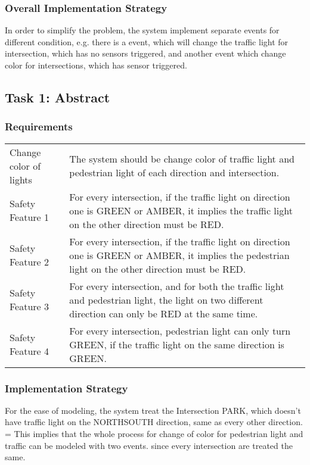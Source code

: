 \documentclass[a4paper]{article}
\begin{document}
\subsubsection{Overall Implementation Strategy}

\indent\indent In order to simplify the problem, the system implement separate events for different condition, e.g. there is a event, which will change the traffic light for intersection, which has no sensors triggered, and another event which change color for intersections, which has sensor triggered.

\subsection{Task 1: Abstract}
\subsubsection{Requirements}
\begin{center}
\begin{tabular}{|p{3.5cm}|p{10cm}|}
\hline
\color{blue}{Requirements} & \color{blue}{Function}\\
\hline
  Change color of lights & The system should be change color of traffic light and pedestrian light of each direction and intersection.\\
  \hline
  Safety Feature 1&  For every intersection, if the traffic light on direction one is GREEN or AMBER, it implies the traffic light on the other direction must be RED.\\
  \hline
   Safety Feature 2 & For every intersection, if the traffic light on direction one is GREEN or AMBER, it implies the pedestrian light on the other direction must be RED.\\
  \hline
  Safety Feature 3 & For every intersection, and for both the traffic light and pedestrian light, the light on two different direction can only be RED at the same time.\\
  \hline
  Safety Feature 4 & For every intersection, pedestrian light can only turn GREEN, if the traffic light on the same direction is GREEN. \\
  \hline
\end{tabular}
\end{center}
\subsubsection{Implementation Strategy}

\indent\indent For the ease of modeling, the system treat the Intersection PARK, which doesn't have traffic light on the NORTHSOUTH direction, same as every other direction.
=
\indent This implies that the whole process for change of color for pedestrian light and traffic can be modeled with two events. since every intersection are treated the same.
\end{document}
